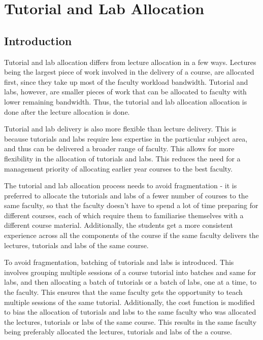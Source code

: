 \chapter{Tutorial and Lab Allocation}

\section{Introduction}

Tutorial and lab allocation differs from lecture allocation in a few ways. Lectures being the largest piece of work involved in the delivery of a course, are allocated first, since they take up most of the faculty workload bandwidth. Tutorial and labs, however, are smaller pieces of work that can be allocated to faculty with lower remaining bandwidth. Thus, the tutorial and lab allocation allocation is done after the lecture allocation is done.

Tutorial and lab delivery is also more flexible than lecture delivery. This is because tutorials and labs require less expertise in the particular subject area, and thus can be delivered a broader range of faculty. This allows for more flexibility in the allocation of tutorials and labs. This reduces the need for a management priority of allocating earlier year courses to the best faculty.

The tutorial and lab allocation process needs to avoid fragmentation - it is preferred to allocate the tutorials and labs of a fewer number of courses to the same faculty, so that the faculty doesn't have to spend a lot of time preparing for different courses, each of which require them to familiarise themselves with a different course material. Additionally, the students get a more consistent experience across all the components of the course if the same faculty delivers the lectures, tutorials and labs of the same course.

To avoid fragmentation, batching of tutorials and labs is introduced. This involves grouping multiple sessions of a course tutorial into batches and same for labs, and then allocating a batch of tutorials or a batch of labs, one at a time, to the faculty. This ensures that the same faculty gets the opportunity to teach multiple sessions of the same tutorial. Additionally, the cost function is modified to bias the allocation of tutorials and labs to the same faculty who was allocated the lectures, tutorials or labs of the same course. This results in the same faculty being preferably allocated the lectures, tutorials and labs of the a course.


